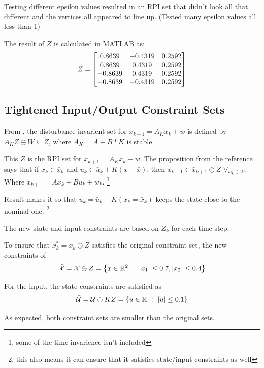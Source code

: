\documentclass[]{article}
\newcommand{\R}{\mathbb{R}}
\newcommand{\st}{\ : \ }
\begin{document}
Testing different epsilon values resulted in an RPI set that didn't look all that different and the vertices all appeared to line up. 
(Tested many epsilon values all less than 1)

The result of $Z$ is calculated in MATLAB as:
\begin{equation}
    Z = \mqty[
        0.8639  & -0.4319 & 0.2592 \\
        0.8639  & 0.4319  & 0.2592 \\
        -0.8639 & 0.4319  & 0.2592 \\
        -0.8639 & -0.4319 & 0.2592 ]
\end{equation}

\newpage
\subsection{Tightened Input/Output Constraint Sets}
From \cite{}, the disturbance invarient set for $x_{k+1} = A_K x_k + w$ is defined by $A_K Z \oplus W \subseteq Z$, where $A_K = A + B*K$ is stable.

This $Z$ is the RPI set for $x_{k+1} = A_K x_k + w$.
The proposition from the reference says that if $x_k \in \bar{x}_k$ and $u_k \in \bar{u}_k + K(x - \bar{x})$, then $x_{k+1} \in \bar{x}_{k+1} \oplus Z$ $\forall_{w_k \in W}$.
Where $x_{k+1} = A x_{k} + B u_{k} + w_k$. 
\footnote{some of the time-invarience isn't included}

Result makes it so that $u_k = \bar{u}_k + K (x_k = \bar{x}_k)$ keeps the state close to the nominal one.
\footnote{this also means it can ensure that it satisfies state/input constraints as well}

The new state and input constraints are based on $Z_k$ for each time-step.

To ensure that $x^*_k = x_k \oplus Z$ satisfies the original constraint set, the new constraints of 
\begin{equation}
    \bar{\mathcal{X}} = \mathcal{X} \ominus Z = \qty{x \in \R^2 \st \abs{x_1} \leq 0.7, \abs{x_2} \leq 0.4}
\end{equation}

For the input, the state constraints are satisfied as 
\begin{equation}
    \bar{\mathcal{U}} = \mathcal{U} \ominus K Z = \qty{u \in \R \st \abs{u} \leq 0.1}
\end{equation}

As expected, both constraint sets are smaller than the original sets.
\end{document}

